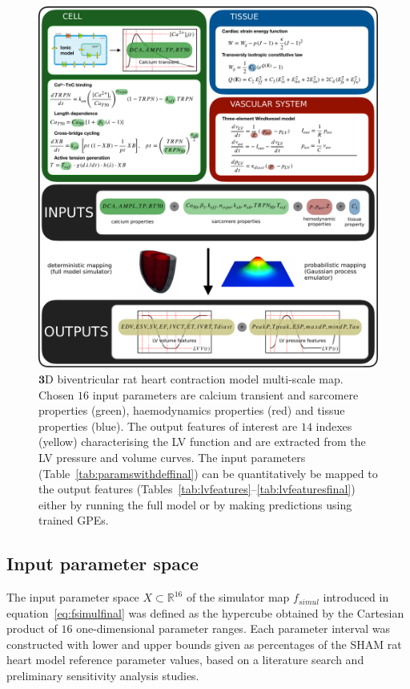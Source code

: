 \begin{figure}[!ht]
    \myfloatalign
    \includegraphics[width=\textwidth]{figures/chapter07/Fig_1.pdf}
    \caption{$\mathbf{3}$D biventricular rat heart contraction model multi-scale map. Chosen $16$ input parameters are calcium transient and sarcomere properties (green), haemodynamics properties (red) and tissue properties (blue). The output features of interest are $14$ indexes (yellow) characterising the LV function and are extracted from the LV pressure and volume curves. The input parameters (Table~\ref{tab:paramswithdeffinal}) can be quantitatively be mapped to the output features (Tables~\ref{tab:lvfeatures}--\ref{tab:lvfeaturesfinal}) either by running the full model or by making predictions using trained GPEs.}
    \label{fig:multiscalemap}
\end{figure}


%
%
%
\subsection{Input parameter space}\label{sec:ch7inputparameterspace}
The input parameter space $X\subset\mathbb{R}^{16}$ of the simulator map $f_{simul}$ introduced in equation~\eqref{eq:fsimulfinal} was defined as the hypercube obtained by the Cartesian product of $16$ one-dimensional parameter ranges. Each parameter interval was constructed with lower and upper bounds given as percentages of the SHAM rat heart model reference parameter values, based on a literature search and preliminary sensitivity analysis studies.

